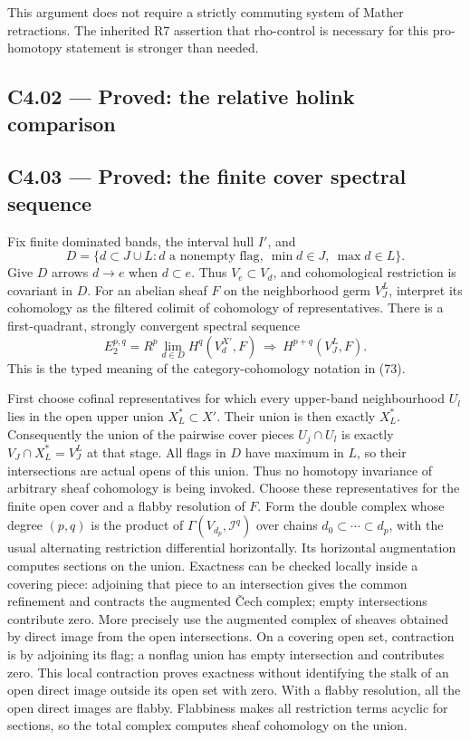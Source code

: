 This argument does not require a strictly commuting system of Mather retractions. The inherited R7 assertion that rho-control is necessary for this pro-homotopy statement is stronger than needed.

\subsection{C4.02 --- Proved: the relative holink comparison}\label{c4.02-proved-the-relative-holink-comparison}



\subsection{C4.03 --- Proved: the finite cover spectral sequence}\label{c4.03-proved-the-finite-cover-spectral-sequence}

Fix finite dominated bands, the interval hull \(I'\), and \[
 D=\{d\subset J\cup L:d\text{ a nonempty flag},\
             \min d\in J,\ \max d\in L\}.
\] Give \(D\) arrows \(d\to e\) when \(d\subset e\). Thus \(V_e\subset V_d\), and cohomological restriction is covariant in \(D\). For an abelian sheaf \(F\) on the neighborhood germ \(V_J^L\), interpret its cohomology as the filtered colimit of cohomology of representatives. There is a first-quadrant, strongly convergent spectral sequence \[
 E_2^{p,q}=R^p\!\lim_{d\in D}H^q(V_d^{X'},F)
 \ \Longrightarrow\ H^{p+q}(V_J^L,F).
\] This is the typed meaning of the category-cohomology notation in (73).

First choose cofinal representatives for which every upper-band neighbourhood \(U_l\) lies in the open upper union \(X_L^*\subset X'\). Their union is then exactly \(X_L^*\). Consequently the union of the pairwise cover pieces \(U_j\cap U_l\) is exactly \(V_J\cap X_L^*=V_J^L\) at that stage. All flags in \(D\) have maximum in \(L\), so their intersections are actual opens of this union. Thus no homotopy invariance of arbitrary sheaf cohomology is being invoked. Choose these representatives for the finite open cover and a flabby resolution of \(F\). Form the double complex whose degree \((p,q)\) is the product of \(\Gamma(V_{d_p},\mathcal I^q)\) over chains \(d_0\subset\cdots\subset d_p\), with the usual alternating restriction differential horizontally. Its horizontal augmentation computes sections on the union. Exactness can be checked locally inside a covering piece: adjoining that piece to an intersection gives the common refinement and contracts the augmented \v{C}ech complex; empty intersections contribute zero. More precisely use the augmented complex of sheaves obtained by direct image from the open intersections. On a covering open set, contraction is by adjoining its flag; a nonflag union has empty intersection and contributes zero. This local contraction proves exactness without identifying the stalk of an open direct image outside its open set with zero. With a flabby resolution, all the open direct images are flabby. Flabbiness makes all restriction terms acyclic for sections, so the total complex computes sheaf cohomology on the union.


